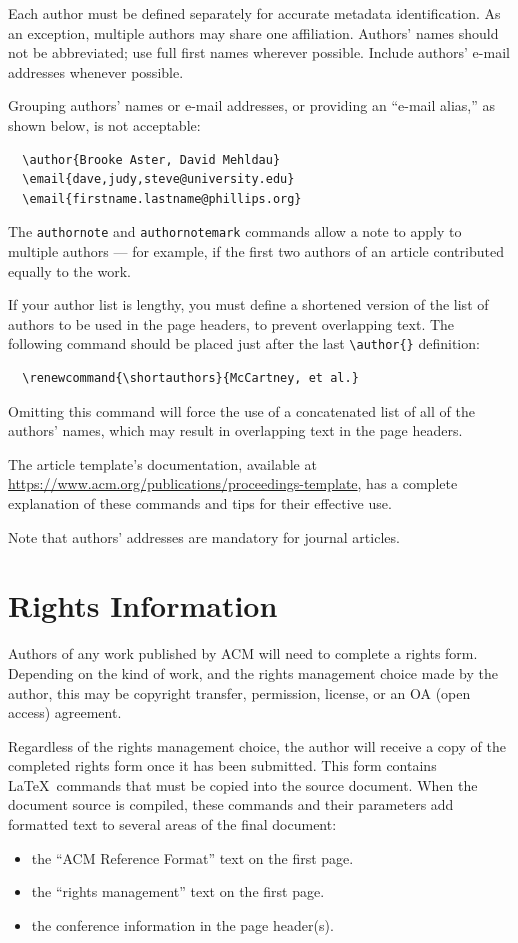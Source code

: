 \documentclass[sigconf, review]{acmart}
\begin{document}
Each author must be defined separately for accurate metadata
identification.  As an exception, multiple authors may share one
affiliation. Authors' names should not be abbreviated; use full first
names wherever possible. Include authors' e-mail addresses whenever
possible.

Grouping authors' names or e-mail addresses, or providing an ``e-mail
alias,'' as shown below, is not acceptable:
\begin{verbatim}
  \author{Brooke Aster, David Mehldau}
  \email{dave,judy,steve@university.edu}
  \email{firstname.lastname@phillips.org}
\end{verbatim}

The \verb|authornote| and \verb|authornotemark| commands allow a note
to apply to multiple authors --- for example, if the first two authors
of an article contributed equally to the work.

If your author list is lengthy, you must define a shortened version of
the list of authors to be used in the page headers, to prevent
overlapping text. The following command should be placed just after
the last \verb|\author{}| definition:
\begin{verbatim}
  \renewcommand{\shortauthors}{McCartney, et al.}
\end{verbatim}
Omitting this command will force the use of a concatenated list of all
of the authors' names, which may result in overlapping text in the
page headers.

The article template's documentation, available at
\url{https://www.acm.org/publications/proceedings-template}, has a
complete explanation of these commands and tips for their effective
use.

Note that authors' addresses are mandatory for journal articles.

\section{Rights Information}

Authors of any work published by ACM will need to complete a rights
form. Depending on the kind of work, and the rights management choice
made by the author, this may be copyright transfer, permission,
license, or an OA (open access) agreement.

Regardless of the rights management choice, the author will receive a
copy of the completed rights form once it has been submitted. This
form contains \LaTeX\ commands that must be copied into the source
document. When the document source is compiled, these commands and
their parameters add formatted text to several areas of the final
document:
\begin{itemize}
\item the ``ACM Reference Format'' text on the first page.
\item the ``rights management'' text on the first page.
\item the conference information in the page header(s).
\end{itemize}
\end{document}
